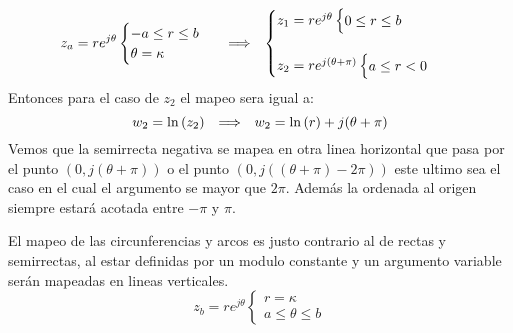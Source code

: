 \begin{equation}
    z_a=re^{j\theta}\begin{cases}
        -a\leq r\leq b\\
        \theta=\kappa
        \end{cases}\hspace{0.25cm} \Longrightarrow \hspace{0.25cm}\begin{cases}
            z_1=re^{j\theta}\begin{cases}
                0\leq r\leq b\\
            \end{cases}\\
            \\
            z_2=re^{j(\theta+\pi)}\begin{cases}
                a\leq r< 0\\
            \end{cases}
        \end{cases}
\end{equation}
Entonces para el caso de $z_2$ el mapeo sera igual a:
\begin{equation}
    w_2=\ln{(z_2)}\hspace{0.25cm} \Longrightarrow \hspace{0.25cm} w_2=\ln{(r)}+j(\theta+\pi)
\end{equation}
Vemos que la semirrecta negativa se mapea en otra linea horizontal que pasa por el punto $(0,j(\theta+\pi))$ o el punto $(0,j((\theta+\pi)-2\pi))$ este ultimo sea el caso en el cual el argumento se mayor que $2\pi$. Además la ordenada al origen siempre estará acotada entre $-\pi$ y $\pi$.
\begin{figure}[H]
    \centering
    \begin{minipage}{0.49\textwidth}
        \centering
        
    \end{minipage}
    \begin{minipage}{0.49\textwidth}
        \centering
        
    \end{minipage}
    \caption{}
    \label{fig:LnF1}
\end{figure}
El mapeo de las circunferencias y arcos es justo contrario al de rectas y semirrectas, al estar definidas por un modulo constante y un argumento variable serán mapeadas en lineas verticales.
\begin{equation}
   z_b=re^{j\theta}\begin{cases}
        r=\kappa\\
        a\leq\theta\leq b
   \end{cases} 
\end{equation}

